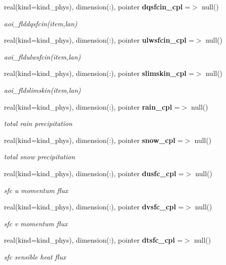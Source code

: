 \begin{DoxyCompactItemize}
real(kind=kind\+\_\+phys), dimension(\+:), pointer \textbf{ dqsfcin\+\_\+cpl} =$>$ null()
\begin{DoxyCompactList}\small\item\em aoi\+\_\+flddqsfcin(item,lan) \end{DoxyCompactList}\item 
real(kind=kind\+\_\+phys), dimension(\+:), pointer \textbf{ ulwsfcin\+\_\+cpl} =$>$ null()
\begin{DoxyCompactList}\small\item\em aoi\+\_\+fldulwsfcin(item,lan) \end{DoxyCompactList}\item 
real(kind=kind\+\_\+phys), dimension(\+:), pointer \textbf{ slimskin\+\_\+cpl} =$>$ null()
\begin{DoxyCompactList}\small\item\em aoi\+\_\+fldslimskin(item,lan) \end{DoxyCompactList}\item 
real(kind=kind\+\_\+phys), dimension(\+:), pointer \textbf{ rain\+\_\+cpl} =$>$ null()
\begin{DoxyCompactList}\small\item\em total rain precipitation \end{DoxyCompactList}\item 
real(kind=kind\+\_\+phys), dimension(\+:), pointer \textbf{ snow\+\_\+cpl} =$>$ null()
\begin{DoxyCompactList}\small\item\em total snow precipitation \end{DoxyCompactList}\item 
real(kind=kind\+\_\+phys), dimension(\+:), pointer \textbf{ dusfc\+\_\+cpl} =$>$ null()
\begin{DoxyCompactList}\small\item\em sfc u momentum flux \end{DoxyCompactList}\item 
real(kind=kind\+\_\+phys), dimension(\+:), pointer \textbf{ dvsfc\+\_\+cpl} =$>$ null()
\begin{DoxyCompactList}\small\item\em sfc v momentum flux \end{DoxyCompactList}\item 
real(kind=kind\+\_\+phys), dimension(\+:), pointer \textbf{ dtsfc\+\_\+cpl} =$>$ null()
\begin{DoxyCompactList}\small\item\em sfc sensible heat flux \end{DoxyCompactList}\item 

\end{DoxyCompactItemize}
